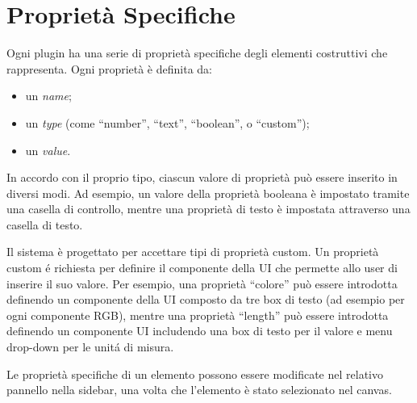 \section{Propriet\`a Specifiche}
\label{sec:chapter_3_section_3}

\noindent

Ogni plugin ha una serie di propriet\`a specifiche degli elementi costruttivi che rappresenta.
Ogni propriet\`a \`e definita da:
\begin{itemize}
  \item un \emph{name};
  \item un \emph{type} (come ``number'', ``text'', ``boolean'', o ``custom'');
  \item un \emph{value}.
\end{itemize}
In accordo con il proprio tipo, ciascun valore di proprietà può essere inserito in diversi modi.
Ad esempio, un valore della proprietà booleana è impostato tramite una casella di controllo,
mentre una proprietà di testo è impostata attraverso una casella di testo.

Il sistema \`e progettato per accettare tipi di propriet\`a custom. Un propriet\`a custom \'e richiesta per definire
il componente della UI che permette allo user di inserire il suo valore.
Per esempio, una propriet\`a ``colore'' pu\`o essere introdotta definendo un componente della UI composto da tre box di testo
(ad esempio per ogni componente RGB), mentre una propriet\`a ``length'' pu\`o essere introdotta definendo un componente UI
includendo una box di testo per il valore e menu drop-down per le unit\'a di misura.

Le propriet\`a specifiche di un elemento possono essere modificate nel relativo pannello nella sidebar, una volta che l'elemento
\`e stato selezionato nel canvas.
\newpage



